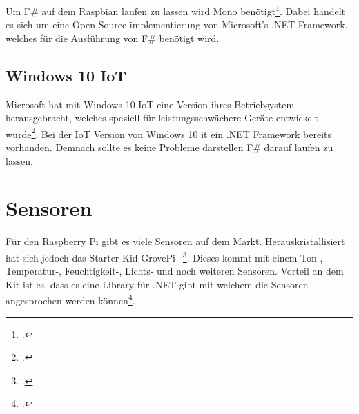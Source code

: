Um F\# auf dem Raspbian laufen zu lassen wird Mono benötigt\footcite{Mono_2016-04-24}. Dabei handelt es sich um eine Open Source implementierung von Microsoft's .NET Framework, welches für die Ausführung von F\# benötigt wird.

\subsection{Windows 10 IoT}
Microsoft hat mit Windows 10 IoT eine Version ihres Betriebsystem herausgebracht, welches speziell für leistungsschwächere Geräte entwickelt wurde\footcite{Windows_IoT_2016-04-24}. Bei der IoT Version von Windows 10 it ein .NET Framework bereits vorhanden. Demnach sollte es keine Probleme darstellen F\# darauf laufen zu lassen.

\section{Sensoren}
Für den Raspberry Pi gibt es viele Sensoren auf dem Markt. Herauskristallisiert hat sich jedoch das Starter Kid GrovePi+\footcite{GrovePi_2016-04-24}. Dieses kommt mit einem Ton-, Temperatur-, Feuchtigkeit-, Lichts- und noch weiteren Sensoren. Vorteil an dem Kit ist es, dass es eine Library für .NET gibt mit welchem die Sensoren angesprochen werden können\footcite{NuGet_GrovePi_2016-04-24}.
